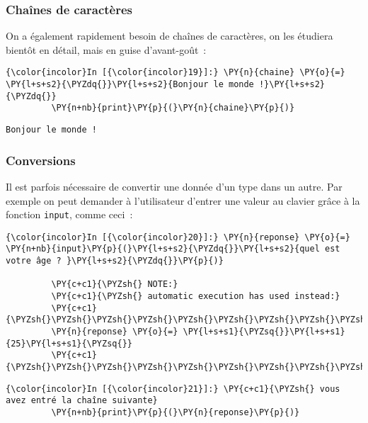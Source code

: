     \hypertarget{chauxeenes-de-caractuxe8res}{%
\subsubsection{Chaînes de
caractères}\label{chauxeenes-de-caractuxe8res}}

    On a également rapidement besoin de chaînes de caractères, on les
étudiera bientôt en détail, mais en guise d'avant-goût~:

    \begin{Verbatim}[commandchars=\\\{\}]
{\color{incolor}In [{\color{incolor}19}]:} \PY{n}{chaine} \PY{o}{=} \PY{l+s+s2}{\PYZdq{}}\PY{l+s+s2}{Bonjour le monde !}\PY{l+s+s2}{\PYZdq{}}
         \PY{n+nb}{print}\PY{p}{(}\PY{n}{chaine}\PY{p}{)}
\end{Verbatim}


    \begin{Verbatim}[commandchars=\\\{\}]
Bonjour le monde !

    \end{Verbatim}

    \hypertarget{conversions}{%
\subsubsection{Conversions}\label{conversions}}

    Il est parfois nécessaire de convertir une donnée d'un type dans un
autre. Par exemple on peut demander à l'utilisateur d'entrer une valeur
au clavier grâce à la fonction \texttt{input}, comme ceci~:

    \begin{Verbatim}[commandchars=\\\{\}]
{\color{incolor}In [{\color{incolor}20}]:} \PY{n}{reponse} \PY{o}{=} \PY{n+nb}{input}\PY{p}{(}\PY{l+s+s2}{\PYZdq{}}\PY{l+s+s2}{quel est votre âge ? }\PY{l+s+s2}{\PYZdq{}}\PY{p}{)}
         
         \PY{c+c1}{\PYZsh{} NOTE:}
         \PY{c+c1}{\PYZsh{} automatic execution has used instead:}
         \PY{c+c1}{\PYZsh{}\PYZsh{}\PYZsh{}\PYZsh{}\PYZsh{}\PYZsh{}\PYZsh{}\PYZsh{}\PYZsh{}\PYZsh{}}
         \PY{n}{reponse} \PY{o}{=} \PY{l+s+s1}{\PYZsq{}}\PY{l+s+s1}{25}\PY{l+s+s1}{\PYZsq{}}
         \PY{c+c1}{\PYZsh{}\PYZsh{}\PYZsh{}\PYZsh{}\PYZsh{}\PYZsh{}\PYZsh{}\PYZsh{}\PYZsh{}\PYZsh{}}
\end{Verbatim}


    \begin{Verbatim}[commandchars=\\\{\}]
{\color{incolor}In [{\color{incolor}21}]:} \PY{c+c1}{\PYZsh{} vous avez entré la chaîne suivante}
         \PY{n+nb}{print}\PY{p}{(}\PY{n}{reponse}\PY{p}{)}
\end{Verbatim}



